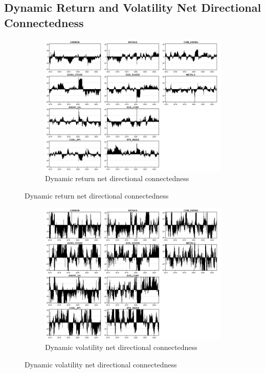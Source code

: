 \documentclass[preprint, 3p,
authoryear]{elsarticle} %
\begin{document}
\begin{landscape}
\section{Dynamic Return and Volatility Net Directional Connectedness}  \label{apdx:NDC}
\begin{figure}[H]
  \caption{Dynamic Net Directional Connectedness (Jan 2013 – Jan 2025)}
  \label{fig:dynNDCfull}
    \centering
      \begin{subfigure}[a]{\textwidth}
        \caption{Dynamic return net directional connectedness}
        \label{fig:dynretNDCfull}
        \includegraphics[width = 1.25\linewidth]{6aApdxB-DynRetNDCfull}
      \end{subfigure}
\end{figure}
\begin{figure}[H]
  \ContinuedFloat
  \centering
      \begin{subfigure}[b]{\textwidth}
        \caption{Dynamic volatility net directional connectedness}
        \label{fig:dynvolNDCfull}
        \includegraphics[width = 1.25\linewidth]{6bApdxB-DynVolNDCfull}
      \end{subfigure}
\end{figure}


\end{landscape}
\end{document}
